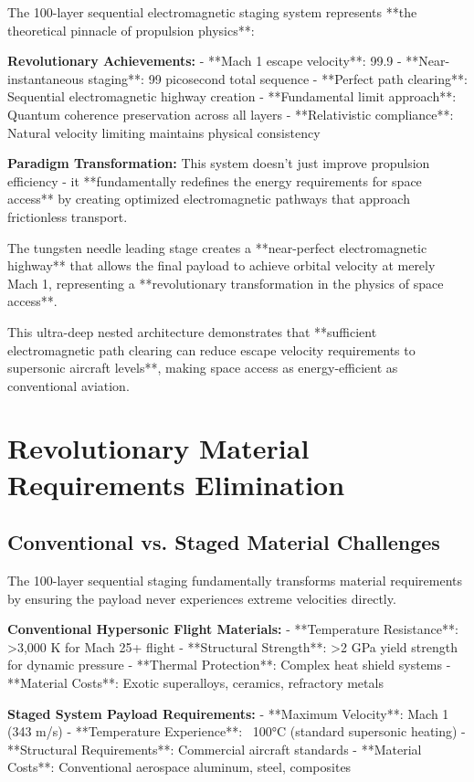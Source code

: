 \documentclass[12pt,a4paper]{article}
\begin{document}
The 100-layer sequential electromagnetic staging system represents **the theoretical pinnacle of propulsion physics**:

\textbf{Revolutionary Achievements:}
- **Mach 1 escape velocity**: 99.9%
- **Near-instantaneous staging**: 99 picosecond total sequence
- **Perfect path clearing**: Sequential electromagnetic highway creation
- **Fundamental limit approach**: Quantum coherence preservation across all layers
- **Relativistic compliance**: Natural velocity limiting maintains physical consistency

\textbf{Paradigm Transformation:}
This system doesn't just improve propulsion efficiency - it **fundamentally redefines the energy requirements for space access** by creating optimized electromagnetic pathways that approach frictionless transport.

The tungsten needle leading stage creates a **near-perfect electromagnetic highway** that allows the final payload to achieve orbital velocity at merely Mach 1, representing a **revolutionary transformation in the physics of space access**.

This ultra-deep nested architecture demonstrates that **sufficient electromagnetic path clearing can reduce escape velocity requirements to supersonic aircraft levels**, making space access as energy-efficient as conventional aviation.

\section{Revolutionary Material Requirements Elimination}

\subsection{Conventional vs. Staged Material Challenges}

The 100-layer sequential staging fundamentally transforms material requirements by ensuring the payload never experiences extreme velocities directly.

\textbf{Conventional Hypersonic Flight Materials:}
- **Temperature Resistance**: >3,000 K for Mach 25+ flight
- **Structural Strength**: >2 GPa yield strength for dynamic pressure
- **Thermal Protection**: Complex heat shield systems
- **Material Costs**: Exotic superalloys, ceramics, refractory metals

\textbf{Staged System Payload Requirements:}
- **Maximum Velocity**: Mach 1 (343 m/s)
- **Temperature Experience**: ~100°C (standard supersonic heating)
- **Structural Requirements**: Commercial aircraft standards
- **Material Costs**: Conventional aerospace aluminum, steel, composites
\end{document}

